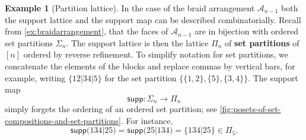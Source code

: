 \documentclass[11pt, oneside, reqno]{amsart}
\theoremstyle{definition}
\newtheorem{example}[theorem]{Example}
\numberwithin{equation}{section}
\newcommand{\defn}[1]{{\color{RoyalBlue}\bf#1}}
\def \supp{\mathsf{supp}}
\begin{document}
\begin{example}[Partition lattice]\label{ex:partitionlattice} \rm
In the case of the braid arrangement $\mathcal{A}_{n-1}$ both the support lattice and
the support map can be described combinatorially.
Recall from \cref{ex:braidarrangement}, that the faces of $\mathcal{A}_{n-1}$
are in bijection with ordered set partitions $\Sigma_n$.
The support lattice is then the lattice $\Pi_n$ of \defn{set
partitions} of $[n]$ ordered by reverse refinement. To simplify notation for set partitions, we concatenate the elements of
the blocks and replace commas by vertical bars,
for example, writing $\{12|34|5\}$ for the
set partition $\{\{1,2 \}, \{5 \}, \{ 3,4 \}\}$. The support map
\[ \supp: \Sigma_n \longrightarrow \Pi_n \]
simply forgets the ordering of an ordered set partition;
see \cref{fig:posets-of-set-compositions-and-set-partitions}. For instance, 
\[
    \supp\big( 134|25 \big) =
    \supp\big(25|134 \big) =
    \{134|25\} \in \Pi_5.
\]


\end{example}
\end{document}
